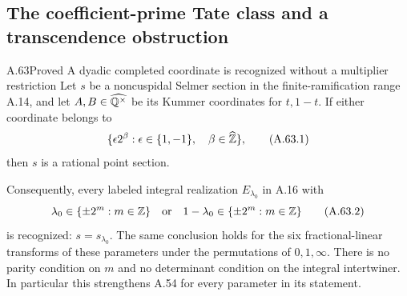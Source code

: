 \subsection{The coefficient-prime Tate class and a transcendence obstruction}

\begin{statement}{A.63}{Proved}
{A dyadic completed coordinate is recognized without a multiplier restriction}
Let $s$ be a noncuspidal Selmer section in the finite-ramification
range A.14, and let $A,B\in\widehat{\mathbb Q^\times}$ be its Kummer
coordinates for $t,1-t$.  If either coordinate belongs to
\[
                  \{\epsilon 2^\beta:
                         \epsilon\in\{1,-1\},\quad
                         \beta\in\widehat{\mathbb Z}\},
\tag{A.63.1}
\]
then $s$ is a rational point section.

Consequently, every labeled integral realization $E_{\lambda_0}$
in A.16 with
\[
            \lambda_0\in\{\pm2^m:m\in\mathbb Z\}
       \quad\hbox{or}\quad
            1-\lambda_0\in\{\pm2^m:m\in\mathbb Z\}
\tag{A.63.2}
\]
is recognized: $s=s_{\lambda_0}$.  The same conclusion holds for
the six fractional-linear transforms of these parameters under
the permutations of $0,1,\infty$.
There is no parity condition on $m$ and no determinant condition
on the integral intertwiner.  In particular this strengthens
A.54 for every parameter in its statement.
\end{statement}

